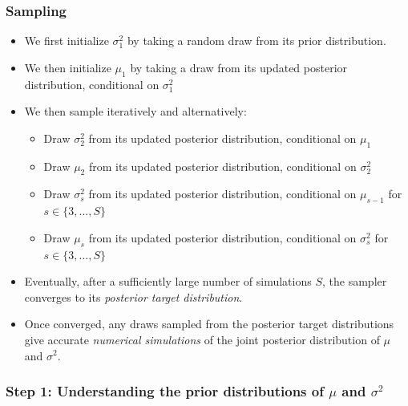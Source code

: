 \documentclass[
  11pt,
]{article}
\providecommand{\tightlist}{%
  \setlength{\itemsep}{0pt}\setlength{\parskip}{0pt}}
\begin{document}
\hypertarget{sampling}{%
\subsubsection{Sampling}\label{sampling}}

\begin{itemize}
\tightlist
\item
  We first initialize \(\sigma_1^2\) by taking a random draw from its
  prior distribution.
\item
  We then initialize \(\mu_1\) by taking a draw from its updated
  posterior distribution, conditional on \(\sigma_1^2\)
\item
  We then sample iteratively and alternatively:

  \begin{itemize}
  \tightlist
  \item
    Draw \(\sigma_2^2\) from its updated posterior distribution,
    conditional on \(\mu_1\)
  \item
    Draw \(\mu_2\) from its updated posterior distribution,
    conditional on \(\sigma_2^2\)
  \item
    Draw \(\sigma_s^2\) from its updated posterior distribution,
    conditional on \(\mu_{s-1}\) for \(s \in \{3,...,S\}\)
  \item
    Draw \(\mu_s\) from its updated posterior distribution,
    conditional on \(\sigma_s^2\) for \(s \in \{3,...,S\}\)
  \end{itemize}
\item
  Eventually, after a sufficiently large number of simulations \(S\),
  the sampler converges to its \emph{posterior target distribution}.
\item
  Once converged, any draws sampled from the posterior target
  distributions give accurate \emph{numerical simulations} of the joint
  posterior distribution of \(\mu\) and \(\sigma^2\).
\end{itemize}

\hypertarget{step-1-understanding-the-prior-distributions-of-mu-and-sigma2}{%
\subsubsection{\texorpdfstring{Step 1: Understanding the prior distributions of \(\mu\) and \(\sigma^2\)}{Step 1: Understanding the prior distributions of \textbackslash mu and \textbackslash sigma\^{}2}}\label{step-1-understanding-the-prior-distributions-of-mu-and-sigma2}}
\end{document}
